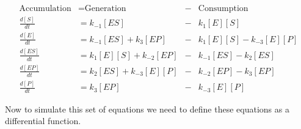\documentclass[
]{article}
\begin{document}
\[\begin{aligned}
  \text{Accumulation} &= \text{Generation} &-& \text{Consumption}
  \\
  \frac{d[S]}{dt} &= k_{-1}[ES] &-& k_{1}[E][S] 
  \\
  \frac{d[E]}{dt} &= k_{-1}[ES] + k_{3}[EP] &-& k_{1}[E][S] - k_{-3}[E][P] 
  \\
  \frac{d[ES]}{dt} &= k_{1}[E][S] + k_{-2}[EP] &-& k_{-1}[ES] - k_{2}[ES] 
  \\  
  \frac{d[EP]}{dt} &= k_{2}[ES] + k_{-3}[E][P] &-& k_{-2}[EP] - k_{3}[EP] 
  \\
  \frac{d[P]}{dt} &= k_{3}[EP] &-& k_{-3}[E][P] 
\end{aligned}\]

Now to simulate this set of equations we need to define these equations as a differential function.
\end{document}
